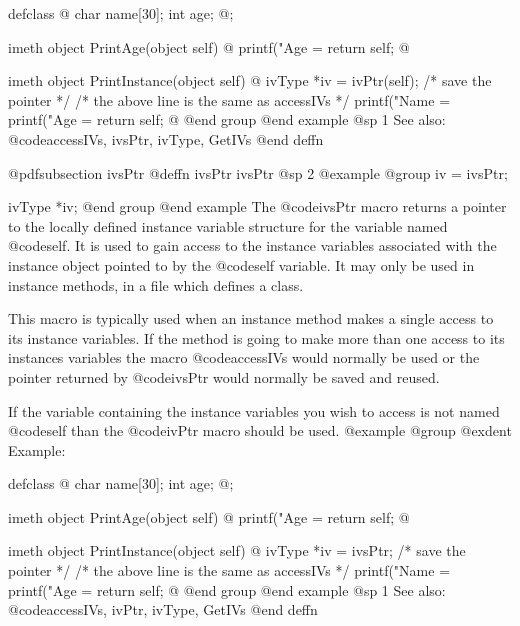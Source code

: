 {{{{defclass  @{
    char    name[30];
    int     age;
@};

imeth object  PrintAge(object self)
@{
    printf("Age = %
    return self;
@}

imeth object  PrintInstance(object self)
@{
    ivType  *iv = ivPtr(self);      /*  save the pointer */
/* the above line is the same as accessIVs  */
    printf("Name = %
    printf("Age = %
    return self;
@}
@end group
@end example
@sp 1
See also:  @code{accessIVs, ivsPtr, ivType, GetIVs}
@end deffn



















@pdfsubsection {ivsPtr}
@deffn {ivsPtr} ivsPtr
@sp 2
@example
@group
iv = ivsPtr;

ivType  *iv;
@end group
@end example
The @code{ivsPtr} macro returns a pointer to the locally defined
instance variable structure for the variable named @code{self}.  It is
used to gain access to the instance variables associated with the
instance object pointed to by the @code{self} variable.  It may only be
used in instance methods, in a file which defines a class.

This macro is typically used when an instance method makes a single
access to its instance variables.  If the method is going to make more
than one access to its instances variables the macro @code{accessIVs}
would normally be used or the pointer returned by @code{ivsPtr}
would normally be saved and reused.

If the variable containing the instance variables you wish to access
is not named @code{self} than the @code{ivPtr} macro should be used.
@example
@group
@exdent Example:

defclass  @{
    char    name[30];
    int     age;
@};

imeth object  PrintAge(object self)
@{
    printf("Age = %
    return self;
@}

imeth object  PrintInstance(object self)
@{
    ivType  *iv = ivsPtr;   /*  save the pointer */
/* the above line is the same as accessIVs  */
    printf("Name = %
    printf("Age = %
    return self;
@}
@end group
@end example
@sp 1
See also:  @code{accessIVs, ivPtr, ivType, GetIVs}
@end deffn












}}}}
